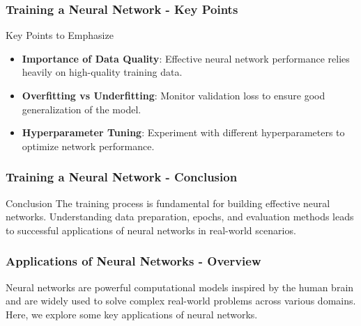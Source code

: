 \documentclass[aspectratio=169]{beamer}
\begin{document}
\begin{frame}[fragile]
    \frametitle{Training a Neural Network - Key Points}
    \begin{block}{Key Points to Emphasize}
        \begin{itemize}
            \item \textbf{Importance of Data Quality}: Effective neural network performance relies heavily on high-quality training data.
            \item \textbf{Overfitting vs Underfitting}: Monitor validation loss to ensure good generalization of the model.
            \item \textbf{Hyperparameter Tuning}: Experiment with different hyperparameters to optimize network performance.
        \end{itemize}
    \end{block}
\end{frame}

\begin{frame}[fragile]
    \frametitle{Training a Neural Network - Conclusion}
    \begin{block}{Conclusion}
        The training process is fundamental for building effective neural networks. Understanding data preparation, epochs, and evaluation methods leads to successful applications of neural networks in real-world scenarios.
    \end{block}
\end{frame}

\begin{frame}[fragile]
    \frametitle{Applications of Neural Networks - Overview}
    Neural networks are powerful computational models inspired by the human brain and are widely used to solve complex real-world problems across various domains. Here, we explore some key applications of neural networks.
\end{frame}
\end{document}
